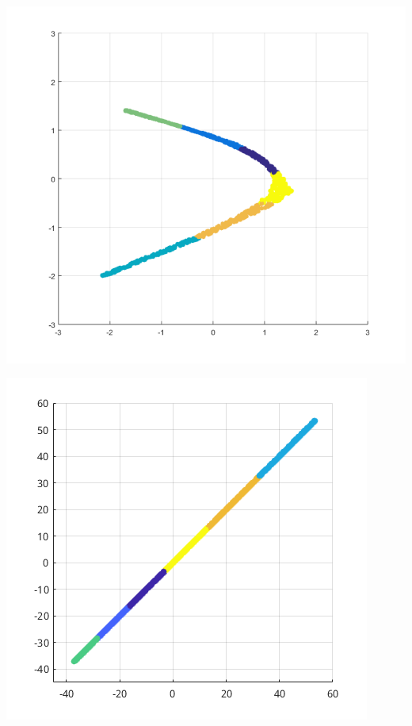 \documentclass[a0,portrait]{a0poster}
\begin{document}
\begin{multicols}{3}
    \begin{minipage}[b]{0.5\linewidth}
        \begin{center}
            \includegraphics[width=1.0\linewidth]{figures/swiss_roll_result_lle.png}
        \end{center}
    \end{minipage}
    \begin{minipage}[b]{0.5\linewidth}
        \begin{center}
            \includegraphics[width=1.0\linewidth]{figures/swiss_roll_result_mds.png}
        \end{center}
    \end{minipage}


\end{multicols}
\end{document}
